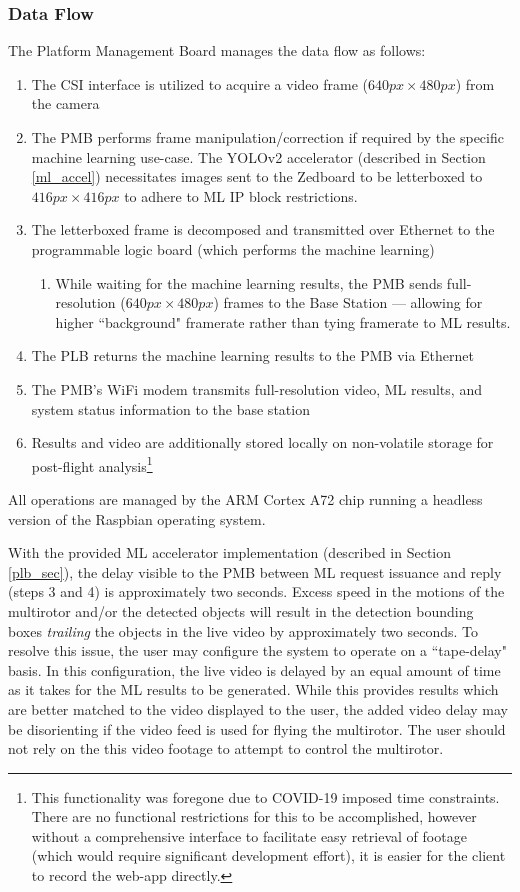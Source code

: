 \subsubsection{Data Flow}
\label{pmb_dataflow}
The Platform Management Board manages the data flow as follows:
\begin{enumerate}
\item The CSI interface is utilized to acquire a video frame ($640px \times 480px$) from the camera
\item The PMB performs frame manipulation/correction if required by the specific machine learning use-case. The YOLOv2 accelerator (described in Section \ref{ml_accel}) necessitates images sent to the Zedboard to be letterboxed to $416px \times 416px$ to adhere to ML IP block restrictions.
\item The letterboxed frame is decomposed and transmitted over Ethernet to the programmable logic board (which performs the machine learning)
\begin{enumerate}
\item While waiting for the machine learning results, the PMB sends full-resolution ($640px \times 480px$) frames to the Base Station --- allowing for higher ``background" framerate rather than tying framerate to ML results.
\end{enumerate}
\item The PLB returns the machine learning results to the PMB via Ethernet
\item The PMB's WiFi modem transmits full-resolution video, ML results, and system status information to the base station
\item Results and video are additionally stored locally on non-volatile storage for post-flight analysis\footnote{This functionality was foregone due to COVID-19 imposed time constraints. There are no functional restrictions for this to be accomplished, however without a comprehensive interface to facilitate easy retrieval of footage (which would require significant development effort), it is easier for the client to record the web-app directly.}
\end{enumerate}

All operations are managed by the ARM Cortex A72 chip running a headless version of the Raspbian operating system. 

With the provided ML accelerator implementation (described in Section \ref{plb_sec}), the delay visible to the PMB between ML request issuance and reply (steps 3 and 4) is approximately two seconds. Excess speed in the motions of the multirotor and/or the detected objects will result in the detection bounding boxes \textit{trailing} the objects in the live video by approximately two seconds. To resolve this issue, the user may configure the system to operate on a ``tape-delay" basis. In this configuration, the live video is delayed by an equal amount of time as it takes for the ML results to be generated. While this provides results which are better matched to the video displayed to the user, the added video delay may be disorienting if the video feed is used for flying the multirotor. The user should not rely on the this video footage to attempt to control the multirotor.

